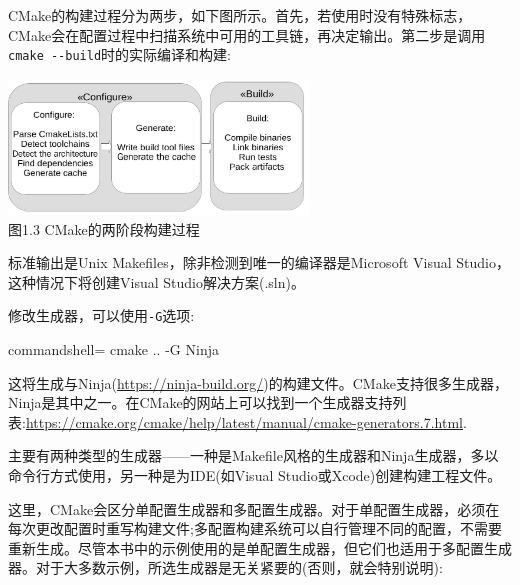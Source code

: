 
CMake的构建过程分为两步，如下图所示。首先，若使用时没有特殊标志，CMake会在配置过程中扫描系统中可用的工具链，再决定输出。第二步是调用\texttt{cmake -{}-build}时的实际编译和构建:

\begin{center}
\includegraphics[width=0.6\textwidth]{content/1/chapter1/images/3.jpg}\\
图1.3  CMake的两阶段构建过程
\end{center}

标准输出是Unix Makefiles，除非检测到唯一的编译器是Microsoft Visual Studio，这种情况下将创建Visual Studio解决方案(.sln)。

修改生成器，可以使用\texttt{-G}选项:

\begin{tcblisting}{commandshell={}}
cmake .. -G Ninja
\end{tcblisting}

这将生成与Ninja(\url{https://ninja-build.org/})的构建文件。CMake支持很多生成器，Ninja是其中之一。在CMake的网站上可以找到一个生成器支持列表:\url{https://cmake.org/cmake/help/latest/manual/cmake-generators.7.html}.

主要有两种类型的生成器——一种是Makefile风格的生成器和Ninja生成器，多以命令行方式使用，另一种是为IDE(如Visual Studio或Xcode)创建构建工程文件。

这里，CMake会区分单配置生成器和多配置生成器。对于单配置生成器，必须在每次更改配置时重写构建文件;多配置构建系统可以自行管理不同的配置，不需要重新生成。尽管本书中的示例使用的是单配置生成器，但它们也适用于多配置生成器。对于大多数示例，所选生成器是无关紧要的(否则，就会特别说明):


